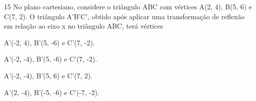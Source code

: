 



\num{15} No plano cartesiano, considere o triângulo ABC com vértices A(2, 4),
B(5, 6) e C(7, 2). O triângulo A'B'C', obtido após aplicar uma transformação de
reflexão em relação ao eixo x no triângulo ABC, terá vértices

\begin{escolha}
\item A'(-2, 4), B'(5, -6) e C'(7, -2).
\item A'(-2, -4), B'(5, -6) e C'(7, -2).
\item A'(-2, -4), B'(5, 6) e C'(7, 2).
\item A'(2, -4), B'(-5, -6) e C'(-7, -2).
\end{escolha}







